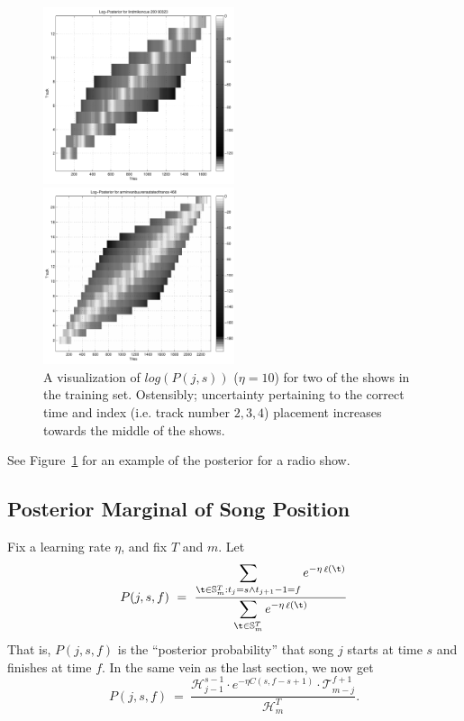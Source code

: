 \documentclass[twocolumn]{article}
\DeclareMathOperator{\loss}{\ell}
\newcommand{\segs}{\mathbb S}
\newcommand{\head}{\mathcal H}
\newcommand{\tail}{\mathcal T}
\begin{document}
\begin{figure}
	\centering
	\includegraphics[width=0.5\textwidth]{images/posterior2}

	\bigskip

	\includegraphics[width=0.5\textwidth]{images/posterior3}
	\caption{A visualization of $log(P(j,s))$ ($\eta=10$) for two of the shows in the training set. Ostensibly; uncertainty pertaining to the correct time and index (i.e. track number $2,3,4$) placement increases towards the middle of the shows.}
	\label{fig:posterior3}
\end{figure} 

See Figure~\ref{fig:posterior3} for an example of the posterior for a radio show. 

\subsection{Posterior Marginal of Song Position}
Fix a learning rate $\eta$, and fix $T$ and $m$. Let
\[
P(j,s,f) ~=~ 
\frac{\displaystyle
	\sum_{\t \in \segs^T_m : t_j = s \land t_{j+1}-1 = f} e^{- \eta \loss(\t)}
}{\displaystyle
\sum_{\t \in \segs^T_m} e^{- \eta \loss(\t)}
}
\]
That is, $P(j,s,f)$ is the ``posterior probability'' that song $j$ starts at time $s$ and finishes at time $f$.
%
In the same vein as the last section, we now get
\[
P(j,s,f) ~=~ \frac{\head^{s-1}_{j-1} \cdot e^{-\eta C(s, f-s+1)} \cdot \tail^{f+1}_{m-j}}{\head^T_m}.
\]
\end{document}
